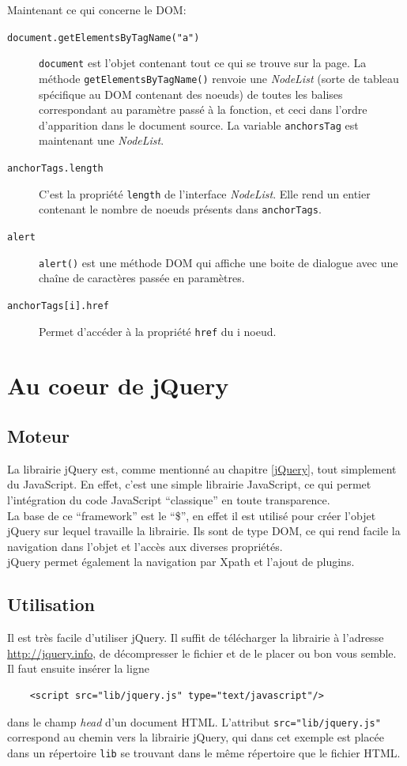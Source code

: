 \documentclass[10pt,a4paper,titlepage]{article}
\begin{document}
Maintenant ce qui concerne le DOM:
\begin{description}
	\item [\texttt{document.getElementsByTagName("a")}] {\texttt{document} est l'objet contenant tout ce qui se trouve sur la page. La méthode \texttt{getElementsByTagName()} renvoie une \emph{NodeList} (sorte de tableau spécifique au DOM contenant des noeuds) de toutes les balises correspondant au paramètre passé à la fonction, et ceci dans l'ordre d'apparition dans le document source. La variable \texttt{anchorsTag} est maintenant une \emph{NodeList}.}
	\item [\texttt{anchorTags.length}] {C'est la propriété \texttt{length} de l'interface \emph{NodeList}. Elle rend un entier contenant le nombre de noeuds présents dans \texttt{anchorTags}.}
	\item [\texttt{alert}] {\texttt{alert()} est une méthode DOM qui affiche une boite de dialogue avec une chaîne de caractères passée en paramètres.}
	\item [\texttt{anchorTags[i].href}] {Permet d'accéder à la propriété \texttt{href} du i noeud.}
\end{description}

\newpage
\renewcommand{\labelitemi}{$\bullet$}
\section{Au coeur de jQuery}
\subsection{Moteur}
La librairie jQuery est, comme mentionné au chapitre \ref{jQuery}, tout simplement du JavaScript. En effet, c'est une simple librairie JavaScript, ce qui permet l'intégration du code JavaScript “classique” en toute transparence.\\

La base de ce “framework” est le “\$”, en effet il est utilisé pour créer l'objet jQuery sur lequel travaille la librairie. Ils sont de type DOM, ce qui rend facile la navigation dans l'objet et l'accès aux diverses propriétés.\\

jQuery permet également la navigation par Xpath et l'ajout de plugins.

\subsection{Utilisation}\label{install}
Il est très facile d'utiliser jQuery. Il suffit de télécharger la librairie à l'adresse \url{http://jquery.info}, de décompresser le fichier et de le placer ou bon vous semble. Il faut ensuite insérer la ligne
\begin{lstlisting}
	<script src="lib/jquery.js" type="text/javascript"/>
\end{lstlisting}
dans le champ \emph{head} d'un document HTML. L'attribut \texttt{src="lib/jquery.js"} correspond au chemin vers la librairie jQuery, qui dans cet exemple est placée dans un répertoire \texttt{lib} se trouvant dans le même répertoire que le fichier HTML.\\
\end{document}
